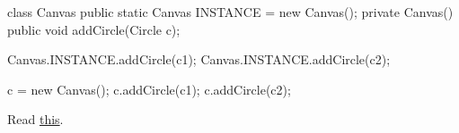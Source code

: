 \documentclass{article}
\begin{document}
\begin{pptWide}{2}
{\small\begin{ffcode}
class Canvas {
  public static Canvas INSTANCE =
    new Canvas();
  private Canvas() {}
  public void addCircle(Circle c);
}

Canvas.INSTANCE.addCircle(c1);
Canvas.INSTANCE.addCircle(c2);
\end{ffcode}
}
\par\columnbreak\par
{\small\begin{ffcode}
c = new Canvas();
c.addCircle(c1);
c.addCircle(c2);
\end{ffcode}
}
\end{pptWide}\par
Read \href{https://www.yegor256.com/2016/06/27/singletons-must-die.html}{this}.
\plush{}

\end{document}
